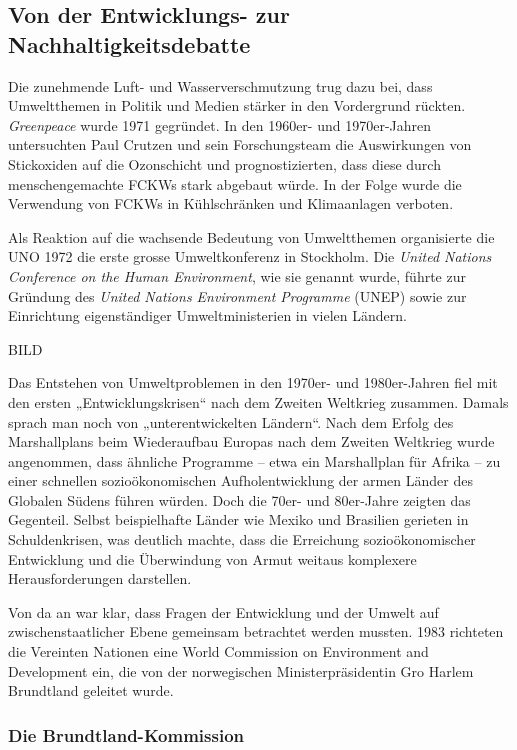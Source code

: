 \documentclass[
  letterpaper,
  DIV=11,
  numbers=noendperiod]{scrartcl}
\begin{document}
\subsection{Von der Entwicklungs- zur
Nachhaltigkeitsdebatte}\label{von-der-entwicklungs--zur-nachhaltigkeitsdebatte}

Die zunehmende Luft- und Wasserverschmutzung trug dazu bei, dass
Umweltthemen in Politik und Medien stärker in den Vordergrund rückten.
\emph{Greenpeace} wurde 1971 gegründet. In den 1960er- und 1970er-Jahren
untersuchten Paul Crutzen und sein Forschungsteam die Auswirkungen von
Stickoxiden auf die Ozonschicht und prognostizierten, dass diese durch
menschengemachte FCKWs stark abgebaut würde. In der Folge wurde die
Verwendung von FCKWs in Kühlschränken und Klimaanlagen verboten.

Als Reaktion auf die wachsende Bedeutung von Umweltthemen organisierte
die UNO 1972 die erste grosse Umweltkonferenz in Stockholm. Die
\emph{United Nations Conference on the Human Environment}, wie sie
genannt wurde, führte zur Gründung des \emph{United Nations Environment
Programme} (UNEP) sowie zur Einrichtung eigenständiger Umweltministerien
in vielen Ländern.

BILD

Das Entstehen von Umweltproblemen in den 1970er- und 1980er-Jahren fiel
mit den ersten „Entwicklungskrisen`` nach dem Zweiten Weltkrieg
zusammen. Damals sprach man noch von „unterentwickelten Ländern``. Nach
dem Erfolg des Marshallplans beim Wiederaufbau Europas nach dem Zweiten
Weltkrieg wurde angenommen, dass ähnliche Programme -- etwa ein
Marshallplan für Afrika -- zu einer schnellen sozioökonomischen
Aufholentwicklung der armen Länder des Globalen Südens führen würden.
Doch die 70er- und 80er-Jahre zeigten das Gegenteil. Selbst
beispielhafte Länder wie Mexiko und Brasilien gerieten in
Schuldenkrisen, was deutlich machte, dass die Erreichung
sozioökonomischer Entwicklung und die Überwindung von Armut weitaus
komplexere Herausforderungen darstellen.

Von da an war klar, dass Fragen der Entwicklung und der Umwelt auf
zwischenstaatlicher Ebene gemeinsam betrachtet werden mussten. 1983
richteten die Vereinten Nationen eine World Commission on Environment
and Development ein, die von der norwegischen Ministerpräsidentin Gro
Harlem Brundtland geleitet wurde.

\subsubsection{Die
Brundtland-Kommission}\label{die-brundtland-kommission}
\end{document}
